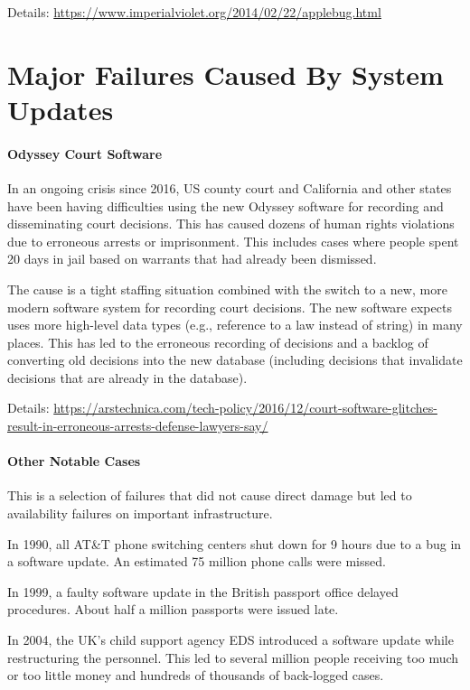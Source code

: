 Details: \url{https://www.imperialviolet.org/2014/02/22/applebug.html}


\section{Major Failures Caused By System Updates}

\paragraph{Odyssey Court Software}
In an ongoing crisis since 2016, US county court and California and other states have been having difficulties using the new Odyssey software for recording and disseminating court decisions.
This has caused dozens of human rights violations due to erroneous arrests or imprisonment.
This includes cases where people spent 20 days in jail based on warrants that had already been dismissed.

The cause is a tight staffing situation combined with the switch to a new, more modern software system for recording court decisions.
The new software expects uses more high-level data types (e.g., reference to a law instead of string) in many places.
This has led to the erroneous recording of decisions and a backlog of converting old decisions into the new database (including decisions that invalidate decisions that are already in the database).

Details: \url{https://arstechnica.com/tech-policy/2016/12/court-software-glitches-result-in-erroneous-arrests-defense-lawyers-say/}

\paragraph{Other Notable Cases}
This is a selection of failures that did not cause direct damage but led to availability failures on important infrastructure.

In 1990, all AT\&T phone switching centers shut down for 9 hours due to a bug in a software update.
An estimated 75 million phone calls were missed.

In 1999, a faulty software update in the British passport office delayed procedures.
About half a million passports were issued late.

In 2004, the UK's child support agency EDS introduced a software update while restructuring the personnel.
This led to several million people receiving too much or too little money and hundreds of thousands of back-logged cases.

